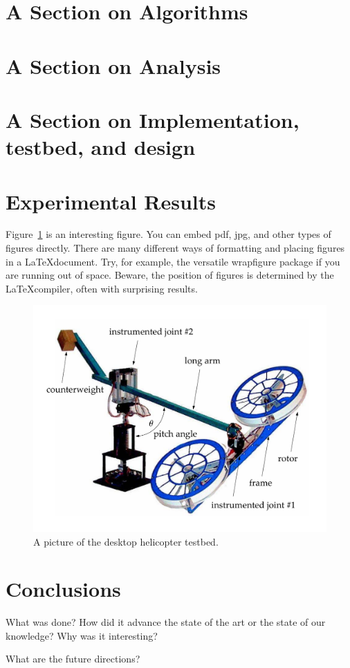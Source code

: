 \documentclass[11pt]{article}
\begin{document}
\section{A Section on Algorithms}
\label{sec:algo}

\section{A Section on Analysis}
\label{sec:analysis}

\section{A Section on Implementation, testbed, and design}
\label{sec:design}

\section{Experimental Results}
\label{sec:experiments}
Figure~\ref{fig:quanser} is an interesting figure. You can embed pdf, jpg, and other types of figures directly. There are many different ways of formatting and placing figures in a \LaTeX document. Try, for example, the  versatile {\sf wrapfigure} package if you are running out of space. Beware, the position of figures is determined by the \LaTeX compiler, often with surprising results.
\begin{figure}[!ht]
	\label{fig:quanser}
	\centering
	\includegraphics[scale=0.3]{quanser.pdf}
		\caption{\scriptsize A picture of the desktop helicopter testbed.}
\end{figure}
\section{Conclusions}
\label{sec:conc}
What was done? How did it advance the state of the art or the state of our knowledge? Why was it interesting? 

What are the future directions?



\end{document}
